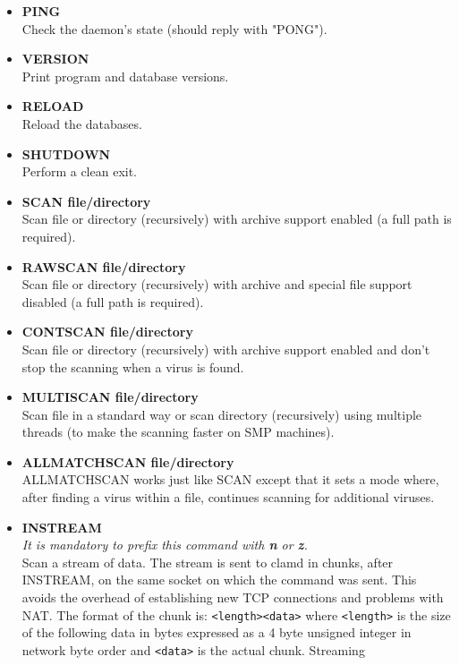 \documentclass[a4paper,titlepage,12pt]{article}
\begin{document}
    \begin{itemize}
	\item \textbf{PING}\\
	    Check the daemon's state (should reply with "PONG").
	\item \textbf{VERSION}\\
	    Print program and database versions.
	\item \textbf{RELOAD}\\
	    Reload the databases.
	\item \textbf{SHUTDOWN}\\
	    Perform a clean exit.
	\item \textbf{SCAN file/directory}\\
	    Scan file or directory (recursively) with archive support
	    enabled (a full path is required).
	\item \textbf{RAWSCAN file/directory}\\
	    Scan file or directory (recursively) with archive and special file
	    support disabled (a full path is required).
	\item \textbf{CONTSCAN file/directory}\\
	    Scan file or directory (recursively) with archive support
	    enabled and don't stop the scanning when a virus is found.
	\item \textbf{MULTISCAN file/directory}\\
	    Scan file in a standard way or scan directory (recursively) using
	    multiple threads (to make the scanning faster on SMP machines).
	\item \textbf{ALLMATCHSCAN file/directory}\\
	    ALLMATCHSCAN works just like SCAN except that it sets a mode
	    where, after finding a virus within a file, continues scanning for
            additional viruses.
	\item \textbf{INSTREAM}\\
	    \emph{It is mandatory to prefix this command with \textbf{n} or
	    \textbf{z}.}\\
	    Scan a stream of data. The stream is sent to clamd in chunks,
	    after INSTREAM, on the same socket on which the command
	    was sent. This avoids the overhead of establishing new TCP
	    connections and problems with NAT. The format of the chunk is:
	    \verb+<length><data>+ where \verb+<length>+ is the size of the
	    following data in bytes expressed as a 4 byte unsigned integer in
	    network byte order and \verb+<data>+ is the actual chunk. Streaming

\end{itemize}
\end{document}

